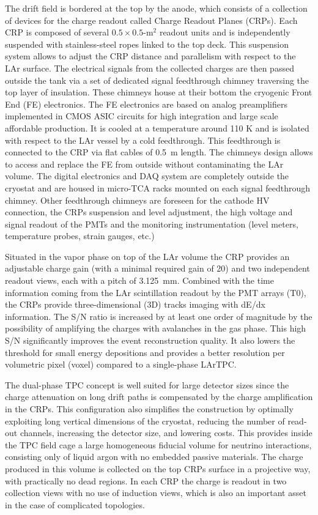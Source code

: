 The drift field is %
bordered at the top by the anode, which consists of a
collection of %
devices for the charge readout called Charge Readout Planes 
(CRPs). Each CRP is composed of several $0.5\times 0.5$-m$^2$ readout
units and is independently suspended with stainless-steel ropes
linked to the top deck. This suspension system allows to adjust the
CRP distance and parallelism with respect to the LAr surface. The
electrical signals from the collected charges are then passed outside
the tank via a set of dedicated signal feedthrough chimney traversing
the top layer of insulation. These chimneys house at their bottom the
cryogenic Front End (FE) electronics.  The FE electronics are based on
analog preamplifiers implemented in CMOS ASIC circuits for high
integration and large scale affordable production. It is cooled at a
temperature around 110 K and is isolated with respect to the LAr
vessel by a cold feedthrough. This feedthrough is connected to the CRP
via flat cables of 0.5~m length. The chimneys design allows to access
and replace the FE from outside without contaminating the LAr
volume. The digital electronics and DAQ system are completely outside
the cryostat and are housed in micro-TCA racks mounted on each signal
feedthrough chimney. Other feedthrough chimneys are foreseen for the
cathode HV connection, the CRPs suspension and level adjustment, the
high voltage and signal readout of the PMTs and the monitoring
instrumentation (level meters, temperature probes, strain gauges,
etc.)

Situated in the vapor phase on top of the LAr volume the CRP provides
an adjustable charge gain (with a minimal required gain of 20) and two
independent readout views, each with a pitch of 3.125~mm.  Combined
with the time information coming from the LAr scintillation readout by
the PMT arrays (T0), the CRPs provide three-dimensional (3D) tracks
imaging with dE/dx information. The S/N ratio is increased by at least
one order of magnitude by the possibility of amplifying the charges
with avalanches in the gas phase.  This high S/N significantly
improves the event reconstruction quality. It also lowers the
threshold for small energy depositions and provides a better
resolution per volumetric pixel (voxel) compared to a 
single-phase LArTPC.

The dual-phase TPC concept is well suited for large detector sizes
since the charge attenuation on long drift paths is compensated by the
charge amplification in the CRPs.  This configuration also simplifies
the construction by optimally exploiting long vertical dimensions of
the cryostat, reducing the number of read-out channels, increasing the
detector size, and lowering costs.  This provides inside the TPC field
cage a large homogeneous fiducial volume for neutrino interactions,
consisting only of liquid argon with no embedded passive
materials. The charge produced in this volume is collected on the top
CRPs surface in a projective way, with practically no dead regions. In
each CRP the charge is readout in two collection views with no use of
induction views, which is also an important asset in the case of
complicated topologies.

